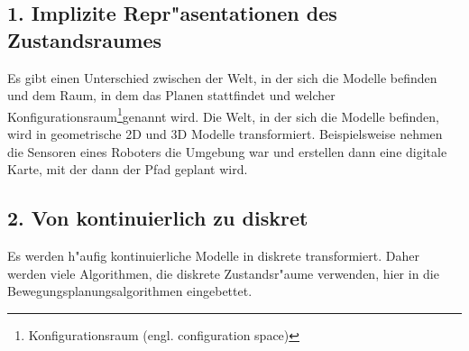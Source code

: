 \subsection*{1. Implizite Repr"asentationen des Zustandsraumes}
Es gibt einen Unterschied zwischen der Welt, in der sich die Modelle befinden und dem Raum, in dem das Planen stattfindet und welcher Konfigurationsraum\footnote{Konfigurationsraum (engl. configuration space)}genannt wird. Die Welt, in der sich die Modelle befinden, wird in geometrische 2D und 3D Modelle transformiert. Beispielsweise nehmen die Sensoren eines Roboters die Umgebung war und erstellen dann eine digitale Karte, mit der dann der Pfad geplant wird.
\subsection*{2. Von kontinuierlich zu diskret}
Es werden h"aufig kontinuierliche Modelle in diskrete transformiert. Daher werden viele Algorithmen, die diskrete Zustandsr"aume verwenden, hier in die Bewegungsplanungsalgorithmen eingebettet.

%
%


